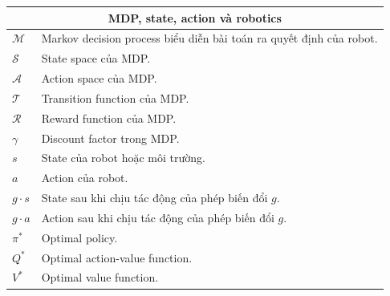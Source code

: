 \documentclass[oneside]{hcmus-report}
\theoremstyle{plain}
\theoremstyle{definition}
\begin{document}
\begin{longtable}{p{} p{}}
\hline

\multicolumn{2}{c}{\textbf{MDP, state, action và robotics}} \\
\hline
$\mathcal{M}$ & Markov decision process biểu diễn bài toán ra quyết định của robot.\\
$\mathcal{S}$ & State space của MDP.\\
$\mathcal{A}$ & Action space của MDP.\\
$\mathcal{T}$ & Transition function của MDP.\\
$\mathcal{R}$ & Reward function của MDP.\\
$\gamma$ & Discount factor trong MDP.\\
$s$ & State của robot hoặc môi trường.\\
$a$ & Action của robot.\\
$g \cdot s$ & State sau khi chịu tác động của phép biến đổi $g$.\\
$g \cdot a$ & Action sau khi chịu tác động của phép biến đổi $g$.\\
$\pi^*$ & Optimal policy.\\
$Q^*$ & Optimal action-value function.\\
$V^*$ & Optimal value function.\\

\hline


\end{longtable}
\end{document}
